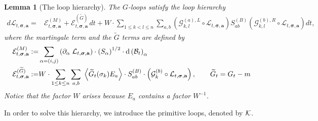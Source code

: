 \documentclass[10pt,reqno]{article}
\theoremstyle{plain} %
\newtheorem{lemma}[theorem]{Lemma}
\theoremstyle{remark}
\numberwithin{equation}{section}
\begin{document}
%

\begin{lemma}[The loop hierarchy] \label{lem:SE_basic}
The $G$-loops satisfy  the loop hierarchy 
\begin{align}\label{eq:mainStoflow}
    d\mathcal{L}_{t, \boldsymbol{\sigma}, \textbf{a}} =& 
    \mathcal{E}^{(M)}_{t, \boldsymbol{\sigma}, \textbf{a}} 
    +
    \mathcal{E}^{(\widetilde{G})}_{t, \boldsymbol{\sigma}, \textbf{a}}\,dt
    +
   W\cdot \sum_{1 \le k < l \le n} \sum_{a, b} \left( \mathcal{G}^{(a), L}_{k, l} \circ \mathcal{L}_{t, \boldsymbol{\sigma}, \textbf{a}} \right) S^{(B)}_{ab} \left( \mathcal{G}^{(b), R}_{k, l} \circ \mathcal{L}_{t, \boldsymbol{\sigma}, \textbf{a}} \right) dt, 
\end{align}
 where the martingale term and the $\widetilde{G}$ terms are defined by 
 \begin{align} \label{def_Edif}
\mathcal{E}^{(M)}_{t, \boldsymbol{\sigma}, \textbf{a}} := & \sum_{\alpha=(i,j)} 
  \left( \partial_{  \alpha} \; {\cal L}_{t, \boldsymbol{\sigma}, \textbf{a}}  \right)
 \cdot \left(S _\alpha\right)^{1/2} \cdot
  \mathrm{d} \left({\cal B}_t\right)_{\alpha} \\\label{def_EwtG}
  \mathcal{E}^{(\widetilde{G})}_{t, \boldsymbol{\sigma}, \textbf{a}}:= &   {W}\cdot \sum_{1 \le k \le n} \sum_{a, b} \; 
 \left \langle \widetilde{G}_t(\sigma_k) E_a \right\rangle
  \cdot S^{(B)}_{ab} \cdot
  \left( {\cal G}^{(b)}_{k} \circ {\cal L}_{t, \boldsymbol{\sigma}, \textbf{a}} \right)  ,\quad \quad \widetilde{G}_t = G_t - m
\end{align}
Notice that the factor $W$ arises because $E_a$ contains a factor $W^{-1}$.

  \end{lemma}
  


 
In order to solve this hierarchy, we introduce the primitive loops, denoted by $\cal K$. 
\end{document}
